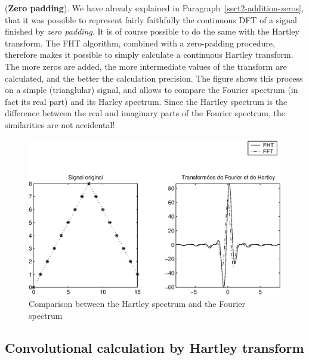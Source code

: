 \begin{rem}{(\upshape \textbf{Zero padding}).} 
 We have already explained in Paragraph~\ref{sect2-addition-zeros}, that it was possible to represent fairly faithfully the continuous DFT of a signal finished by \textit{zero padding}. It is of course possible to do the same with the Hartley transform. The FHT algorithm, combined with a zero-padding procedure, therefore makes it possible to simply calculate a continuous Hartley transform. The more zeros are added, the more intermediate values of the transform are calculated, and the better the calculation precision. The figure  shows this process on a simple (trianglular) signal, and allows to compare the Fourier spectrum (in fact its real part) and its Harley spectrum. Since the Hartley spectrum is the difference between the real and imaginary parts of the Fourier spectrum, the similarities are not accidental!\begin{figure}[ht]
    \begin{center}
    \includegraphics[scale=0.7]{images/comparaison-fht-fft.eps}
    \end{center}
    \caption{Comparison between the Hartley spectrum and the Fourier spectrum}
              \label{fig-comparison-fht-fft}
\end{figure}
\end{rem}
 
\subsection{Convolutional calculation by Hartley transform}
\label{sect2-usage-hartley-convolution} 
 
